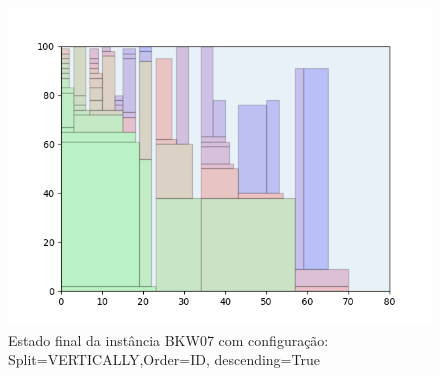 \begin{figure}[H]
    \centering
    \caption[]{Estado final da instância BKW07 com configuração: Split=VERTICALLY,Order=ID, descending=True}
    \label{fig:bkw07-vertically-id-true}
    \includegraphics[scale=0.5]{output/figures/bkw/bkw07/vertically/id/true/00}
\end{figure}